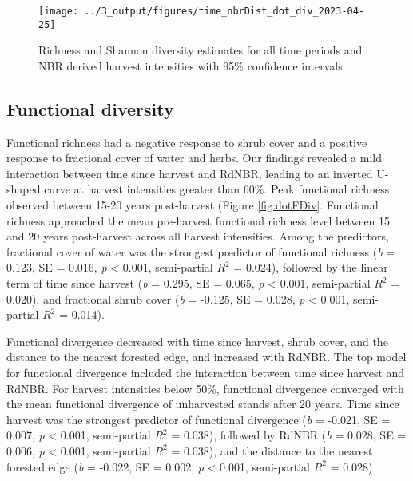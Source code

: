 \documentclass[
  12pt,
]{article}
\begin{document}
\begin{figure}[H]
\texttt{[image: ../3\_output/figures/time\_nbrDist\_dot\_div\_2023-04-25]} \caption{Richness and Shannon diversity estimates for all time periods and NBR derived harvest intensities with 95$\%$  confidence intervals.}\label{fig:dotDiv}
\end{figure}

\hypertarget{functional-diversity}{%
\subsection{Functional diversity}\label{functional-diversity}}

Functional richness had a negative response to shrub cover and a positive response to fractional cover of water and herbs. Our findings revealed a mild interaction between time since harvest and RdNBR, leading to an inverted U-shaped curve at harvest intensities greater than 60\%. Peak functional richness observed between 15-20 years post-harvest (Figure \ref{fig:dotFDiv}. Functional richness approached the mean pre-harvest functional richness level between 15 and 20 years post-harvest across all harvest intensities. Among the predictors, fractional cover of water was the strongest predictor of functional richness (\emph{b} = 0.123, SE = 0.016, \emph{p} \textless{} 0.001, semi-partial \(R^2\) = 0.024), followed by the linear term of time since harvest (\emph{b} = 0.295, SE = 0.065, \emph{p} \textless{} 0.001, semi-partial \(R^2\) = 0.020), and fractional shrub cover (\emph{b} = -0.125, SE = 0.028, \emph{p} \textless{} 0.001, semi-partial \(R^2\) = 0.014).

Functional divergence decreased with time since harvest, shrub cover, and the distance to the nearest forested edge, and increased with RdNBR. The top model for functional divergence included the interaction between time since harvest and RdNBR. For harvest intensities below 50\%, functional divergence converged with the mean functional divergence of unharvested stands after 20 years. Time since harvest was the strongest predictor of functional divergence (\emph{b} = -0.021, SE = 0.007, \emph{p} \textless{} 0.001, semi-partial \(R^2\) = 0.038), followed by RdNBR (\emph{b} = 0.028, SE = 0.006, \emph{p} \textless{} 0.001, semi-partial \(R^2\) = 0.038), and the distance to the nearest forested edge (\emph{b} = -0.022, SE = 0.002, \emph{p} \textless{} 0.001, semi-partial \(R^2\) = 0.028)
\end{document}

